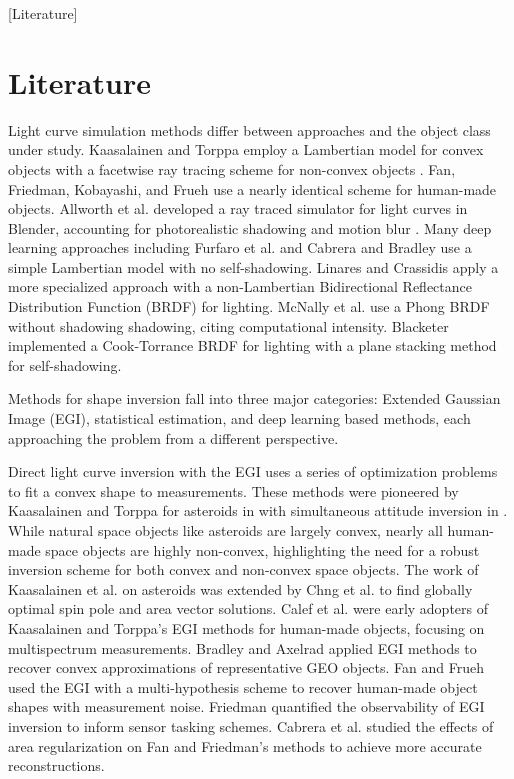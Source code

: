 [Literature]

\chapter{Literature}

Light curve simulation methods differ between approaches and the object class under study. Kaasalainen and Torppa employ a Lambertian model for convex objects with a facetwise ray tracing scheme for non-convex objects \cite{kaasalainen2001}. Fan, Friedman, Kobayashi, and Frueh \cite{fan2016, fan2020thesis,friedman2020,kobayashi2020,freuh2014} use a nearly identical scheme for human-made objects. Allworth et al. developed a ray traced simulator for light curves in Blender, accounting for photorealistic shadowing and motion blur \cite{allworth2020, allworth2021}. Many deep learning approaches including Furfaro et al. \cite{furfaro2019} and Cabrera and Bradley \cite{cabrera2021,bradley2014} use a simple Lambertian model with no self-shadowing. Linares and Crassidis \cite{linares2017} apply a more specialized approach with a non-Lambertian Bidirectional Reflectance Distribution Function (BRDF) for lighting. McNally et al. \cite{mcnally2021} use a Phong BRDF without shadowing shadowing, citing computational intensity. Blacketer \cite{blacketer2022} implemented a Cook-Torrance BRDF for lighting with a plane stacking method for self-shadowing.

Methods for shape inversion fall into three major categories: Extended Gaussian Image (EGI), statistical estimation, and deep learning based methods, each approaching the problem from a different perspective.

Direct light curve inversion with the EGI uses a series of optimization problems to fit a convex shape to measurements. These methods were pioneered by Kaasalainen and Torppa for asteroids in \cite{kaasalainen2001} with simultaneous attitude inversion in \cite{kaasalainen2001}. While natural space objects like asteroids are largely convex, nearly all human-made space objects are highly non-convex, highlighting the need for a robust inversion scheme for both convex and non-convex space objects. The work of Kaasalainen et al. on asteroids was extended by Chng et al. \cite{chng2022} to find globally optimal spin pole and area vector solutions. Calef et al. \cite{calef2006photometric} were early adopters of Kaasalainen and Torppa's EGI methods for human-made objects, focusing on multispectrum measurements. Bradley and Axelrad \cite{bradley2014} applied EGI methods to recover convex approximations of representative GEO objects. Fan and Frueh \cite{fan2019, fan2020thesis, fan2021} used the EGI with a multi-hypothesis scheme to recover human-made object shapes with measurement noise. Friedman \cite{friedman2020, friedman2022} quantified the observability of EGI inversion to inform sensor tasking schemes. Cabrera et al. \cite{cabrera2021} studied the effects of area regularization on Fan and Friedman's methods to achieve more accurate reconstructions.

